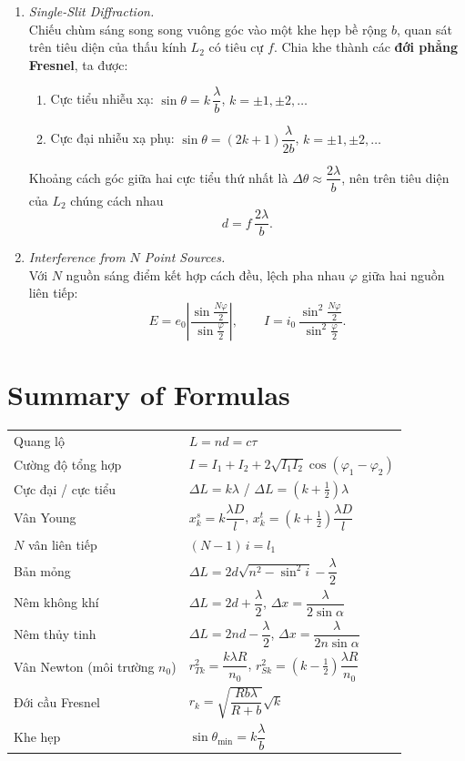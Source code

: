 \begin{enumerate}
\item \textit{Single-Slit Diffraction.}\\
Chiếu chùm sáng song song vuông góc vào một khe hẹp bề rộng $b$, quan sát trên tiêu diện của thấu kính $L_2$ có tiêu cự $f$. Chia khe thành các \textbf{đới phẳng Fresnel}, ta được:
\begin{enumerate}
  \item[(a)] Cực tiểu nhiễu xạ: $\sin\theta = k\,\dfrac{\lambda}{b}$, $k = \pm1, \pm2, \dots$
  \item[(b)] Cực đại nhiễu xạ phụ: $\sin\theta = (2k+1)\dfrac{\lambda}{2b}$, $k = \pm1, \pm2, \dots$
\end{enumerate}
Khoảng cách góc giữa hai cực tiểu thứ nhất là $\Delta\theta \approx \dfrac{2\lambda}{b}$, nên trên tiêu diện của $L_2$ chúng cách nhau
\[
d = f\,\frac{2\lambda}{b}.
\]

\item \textit{Interference from $N$ Point Sources.}\\
Với $N$ nguồn sáng điểm kết hợp cách đều, lệch pha nhau $\varphi$ giữa hai nguồn liên tiếp:
\[
E = e_0\left|\frac{\sin\frac{N\varphi}{2}}{\sin\frac{\varphi}{2}}\right|,
\qquad
I = i_0\,\frac{\sin^2\frac{N\varphi}{2}}{\sin^2\frac{\varphi}{2}}.
\]
\end{enumerate}

\section{Summary of Formulas}
\begin{center}
\renewcommand{\arraystretch}{1.6}
\begin{tabular}{@{}ll@{}}
\toprule
Quang lộ & $L = nd = c\tau$ \\
Cường độ tổng hợp & $I = I_1 + I_2 + 2\sqrt{I_1I_2}\cos(\varphi_1 - \varphi_2)$ \\
Cực đại / cực tiểu & $\Delta L = k\lambda$ \;/\; $\Delta L = \left(k + \tfrac12\right)\lambda$ \\
Vân Young & $x_k^s = k\dfrac{\lambda D}{l}$, \quad $x_k^t = \left(k + \tfrac12\right)\dfrac{\lambda D}{l}$ \\
$N$ vân liên tiếp & $(N - 1)\,i = l_1$ \\
Bản mỏng & $\Delta L = 2d\sqrt{n^2 - \sin^2 i} - \dfrac{\lambda}{2}$ \\
Nêm không khí & $\Delta L = 2d + \dfrac{\lambda}{2}$, \quad $\Delta x = \dfrac{\lambda}{2\sin\alpha}$ \\
Nêm thủy tinh & $\Delta L = 2nd - \dfrac{\lambda}{2}$, \quad $\Delta x = \dfrac{\lambda}{2n\sin\alpha}$ \\
Vân Newton (môi trường $n_0$) & $r_{Tk}^2 = \dfrac{k\lambda R}{n_0}$, \quad $r_{Sk}^2 = \left(k - \tfrac12\right)\dfrac{\lambda R}{n_0}$ \\
Đới cầu Fresnel & $r_k = \sqrt{\dfrac{Rb\lambda}{R + b}}\sqrt{k}$ \\
Khe hẹp & $\sin\theta_{\min} = k\dfrac{\lambda}{b}$ \\
\bottomrule
\end{tabular}
\end{center}
